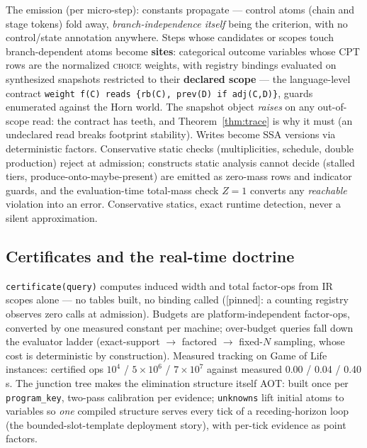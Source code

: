 \documentclass[11pt]{article}
\newcommand{\stpinned}{[\textsf{pinned}]}
\theoremstyle{plain}
\theoremstyle{definition}
\theoremstyle{remark}
\begin{document}
The emission (per micro-step): constants propagate --- control atoms
(chain and stage tokens) fold away, \emph{branch-independence itself}
being the criterion, with no control/state annotation anywhere. Steps
whose candidates or scopes touch branch-dependent atoms become
\textbf{sites}: categorical outcome variables whose CPT rows are the
normalized \textsc{choice} weights, with registry bindings evaluated on
synthesized snapshots restricted to their \textbf{declared scope} ---
the language-level contract
\texttt{weight f(C) reads \{rb(C), prev(D) if adj(C,D)\}}, guards
enumerated against the Horn world. The snapshot object \emph{raises} on
any out-of-scope read: the contract has teeth, and
Theorem~\ref{thm:trace} is why it must (an undeclared read breaks
footprint stability). Writes become SSA versions via deterministic
factors. Conservative static checks (multiplicities, schedule, double
production) reject at admission; constructs static analysis cannot
decide (stalled tiers, produce-onto-maybe-present) are emitted as
zero-mass rows and indicator guards, and the evaluation-time total-mass
check $Z = 1$ converts any \emph{reachable} violation into an error.
Conservative statics, exact runtime detection, never a silent
approximation.

\subsection{Certificates and the real-time doctrine}\label{sec:certs}

\texttt{certificate(query)} computes induced width and total factor-ops
from IR scopes alone --- no tables built, no binding called
(\stpinned{}: a counting registry observes zero calls at admission).
Budgets are platform-independent factor-ops, converted by one measured
constant per machine; over-budget
queries fall down the evaluator ladder (exact-support $\to$ factored
$\to$ fixed-$N$ sampling, whose cost is deterministic by construction).
Measured tracking on Game of Life instances: certified ops $10^4$ /
$5 \times 10^6$ / $7 \times 10^7$ against measured 0.00 / 0.04 / 0.40
s. The junction tree makes the elimination structure itself AOT: built
once per \texttt{program\_key}, two-pass calibration per evidence;
\texttt{unknowns} lift initial atoms to variables so \emph{one}
compiled structure serves every tick of a receding-horizon loop (the
bounded-slot-template deployment story), with per-tick evidence as
point factors.
\end{document}
